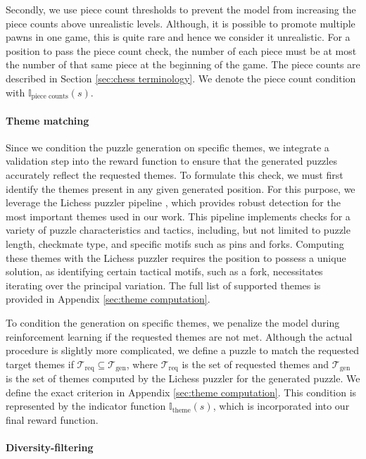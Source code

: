 Secondly, we use piece count thresholds to prevent the model from increasing the piece counts above unrealistic levels. Although, it is possible to promote multiple pawns in one game, this is quite rare and hence we consider it unrealistic. For a position to pass the piece count check, the number of each piece must be at most the number of that same piece at the beginning of the game. The piece counts are described in Section \ref{sec:chess terminology}. We denote the piece count condition with $\mathbb{I}_{\text{piece counts}}(s)$.

\paragraph{Theme matching}
\label{sec:theme matching}

Since we condition the puzzle generation on specific themes, we integrate a validation step into the reward function to ensure that the generated puzzles accurately reflect the requested themes. To formulate this check, we must first identify the themes present in any given generated position. For this purpose, we leverage the Lichess puzzler pipeline \cite{lichesspuzzler}, which provides robust detection for the most important themes used in our work. This pipeline implements checks for a variety of puzzle characteristics and tactics, including, but not limited to puzzle length, checkmate type, and specific motifs such as pins and forks. Computing these themes with the Lichess puzzler requires the position to possess a unique solution, as identifying certain tactical motifs, such as a fork, necessitates iterating over the principal variation. The full list of supported themes is provided in Appendix \ref{sec:theme computation}.

To condition the generation on specific themes, we penalize the model during reinforcement learning if the requested themes are not met. Although the actual procedure is slightly more complicated, we define a puzzle to match the requested target themes if $\mathcal{T}_{\text{req}} \subseteq \mathcal{T}_{\text{gen}}$, where $\mathcal{T}_{\text{req}}$ is the set of requested themes and $\mathcal{T}_{\text{gen}}$ is the set of themes computed by the Lichess puzzler for the generated puzzle. We define the exact criterion in Appendix \ref{sec:theme computation}. This condition is represented by the indicator function $\mathbb{I}_{\text{theme}}(s)$, which is incorporated into our final reward function.


\paragraph{Diversity-filtering}

